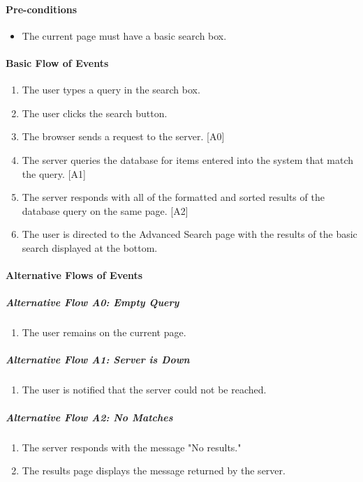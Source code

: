 \documentclass{article}
\begin{document}
\paragraph{Pre-conditions}
\begin{itemize}
\item The current page must have a basic search box.
\end{itemize}

\paragraph{Basic Flow of Events}
\begin{enumerate}
\item The user types a query in the search box.
\item The user clicks the search button.
\item The browser sends a request to the server. [A0]
\item The server queries the database for items entered into the system that match the query. [A1]
\item The server responds with all of the formatted and sorted results of the database query on the same page. [A2]
\item The user is directed to the Advanced Search page with the results of the basic search displayed at the bottom.
\end{enumerate}

\paragraph{Alternative Flows of Events}

\subparagraph{Alternative Flow A0: Empty Query}
\begin{enumerate}
\item The user remains on the current page.
\end{enumerate}

\subparagraph{Alternative Flow A1: Server is Down}
\begin{enumerate}
\item The user is notified that the server could not be reached.
\end{enumerate}

\subparagraph{Alternative Flow A2: No Matches}
\begin{enumerate}
\item The server responds with the message "No results."
\item The results page displays the message returned by the server.
\end{enumerate}
\end{document}
